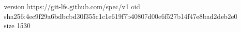 version https://git-lfs.github.com/spec/v1
oid sha256:4ec9f29a6bdbcbd30f355c1c1e619f7b40807d00e6f527b14f47e8bad2deb2e0
size 1530
